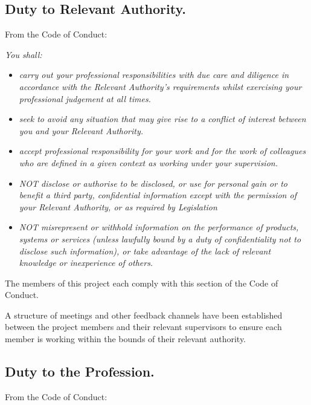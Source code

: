 \documentclass[a4paper]{report}
\begin{document}
\subsection*{Duty to Relevant Authority.}

From the Code of Conduct: \cite{CoC}

\textit{You shall:}
\begin{itemize}
\item \textit{carry out your professional responsibilities with due care and diligence in accordance with the Relevant Authority’s requirements whilst exercising your professional judgement at all times.}
\item \textit{seek to avoid any situation that may give rise to a conflict of interest between you and your Relevant Authority.}
\item \textit{accept professional responsibility for your work and for the work of colleagues who are defined in a given context as working under your supervision.}
\item \textit{NOT disclose or authorise to be disclosed, or use for personal gain or to benefit a third party, confidential information except with the permission of your Relevant Authority, or as required by Legislation}
\item \textit{NOT misrepresent or withhold information on the performance of products, systems or services (unless lawfully bound by a duty of confidentiality not to disclose such information), or take advantage of the lack of relevant knowledge or inexperience of others. }
\end{itemize}

The members of this project each comply with this section of the Code of Conduct.

A structure of meetings and other feedback channels have been established between the project members and their relevant supervisors to ensure each member is working within the bounds of their relevant authority.

\subsection*{Duty to the Profession.}

From the Code of Conduct: \cite{CoC}
\end{document}
